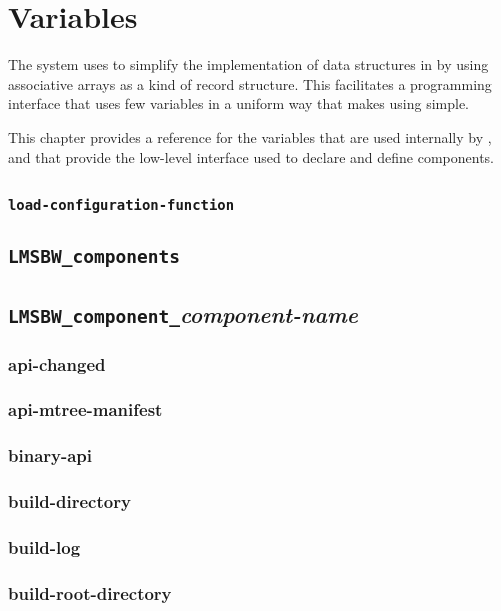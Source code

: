 \chapter{Variables}

The \lmsbw system uses \gmsl to simplify the implementation of data
structures in \make by using associative arrays as a kind of record
structure.  This facilitates a programming interface that uses few
variables in a uniform way that makes using \lmsbw simple.

This chapter provides a reference for the variables that are used
internally by \lmsbw, and that provide the low-level interface used to
declare and define components.

\section{\lmsbwconfiguration}
\subsection{\texttt{load-configuration-function}}

\section{\texttt{LMSBW\_components}}

\section{\texttt{LMSBW\_component\_}\emph{component-name}}
\subsection{api-changed}
\subsection{api-mtree-manifest}
\subsection{binary-api}
\subsection{build-directory}
\subsection{build-log}
\subsection{build-root-directory}
